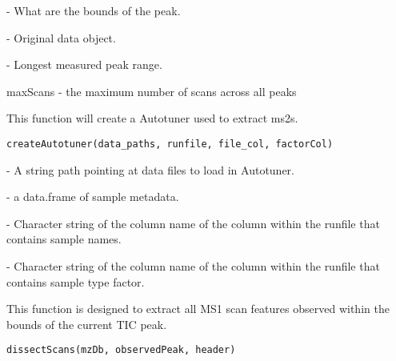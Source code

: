 \documentclass[a4paper]{book}
\begin{document}
%
\begin{Arguments}
\begin{ldescription}
\item[\code{peakBounds}] - What are the bounds of the peak.

\item[\code{sortedAllEIC}] - Original data object.

\item[\code{prevRange}] - Longest measured peak range.
\end{ldescription}
\end{Arguments}
%
\begin{Value}
maxScans - the maximum number of scans across all peaks
\end{Value}
%
\begin{Description}\relax
This function will create a Autotuner used to extract ms2s.
\end{Description}
%
\begin{Usage}
\begin{verbatim}
createAutotuner(data_paths, runfile, file_col, factorCol)
\end{verbatim}
\end{Usage}
%
\begin{Arguments}
\begin{ldescription}
\item[\code{data\_paths}] - A string path pointing at data files to load in Autotuner.

\item[\code{runfile}] - a data.frame of sample metadata.

\item[\code{file\_col}] - Character string of the column name of the column within
the runfile that contains sample names.

\item[\code{factorCol}] - Character string of the column name of the column within
the runfile that contains sample type factor.
\end{ldescription}
\end{Arguments}
%
\begin{Description}\relax
This function is designed to extract all MS1 scan features
observed within the bounds of the current TIC peak.
\end{Description}
%
\begin{Usage}
\begin{verbatim}
dissectScans(mzDb, observedPeak, header)
\end{verbatim}
\end{Usage}
\end{document}
